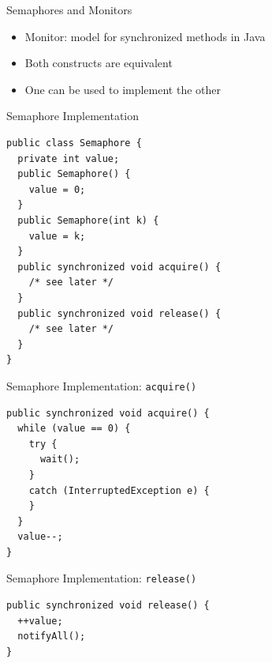 \begin{frame}{Semaphores and Monitors}
  \begin{itemize}
  \item Monitor: model for synchronized methods in Java
  \item Both constructs are equivalent
  \item \alert{One can be used to implement the other}
  \end{itemize}
\end{frame}

\begin{frame}[fragile]{Semaphore Implementation}
\begin{lstlisting}
public class Semaphore {
  private int value;
  public Semaphore() { 
    value = 0; 
  }
  public Semaphore(int k) { 
    value = k; 
  }
  public synchronized void acquire() { 
    /* see later */ 
  }
  public synchronized void release() { 
    /* see later */ 
  }   
}
\end{lstlisting}
\end{frame}

\begin{frame}[fragile]{Semaphore Implementation: \lstinline!acquire()!}
\begin{lstlisting}
public synchronized void acquire() {
  while (value == 0) {
    try {
      wait();
    }
    catch (InterruptedException e) { 
    }
  }
  value--;
}
\end{lstlisting}
\end{frame}

\begin{frame}[fragile]{Semaphore Implementation: \lstinline!release()!}
\begin{lstlisting}
public synchronized void release() {
  ++value;
  notifyAll();
}
\end{lstlisting}
\end{frame}

